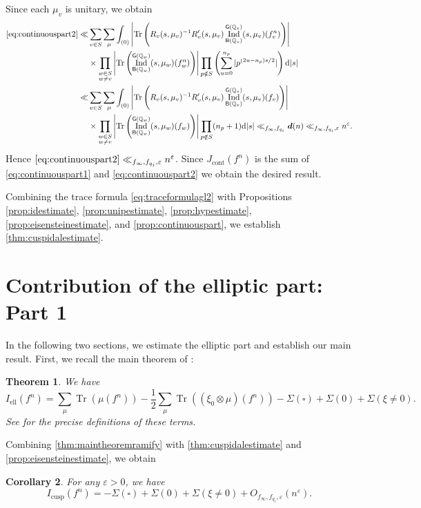\documentclass[10pt,oneside,reqno]{amsart}
\makeatletter
\newcommand\rmd{\mathrm{d}}
\newcommand\QQ{\mathbb{Q}}
\newcommand\B{\mathsf{B}}
\newcommand\G{\mathsf{G}}
\DeclareMathOperator\Tr{Tr}
\DeclareMathOperator\Ind{Ind}
\newcommand\el{\mathrm{ell}}
\theoremstyle{THEOREM}
\newtheorem{theorem}{Theorem}[section]
\newtheorem{corollary}[theorem]{Corollary}
\theoremstyle{DEFINITION}
\theoremstyle{EXERCISE}
\numberwithin{equation}{section}
\renewenvironment{proof}[1][\proofname]{\par
  \vspace{-6pt}
  \pushQED{\qed}
  \normalfont \topsep6\p@\@plus6\p@\relax
  \trivlist
  \item[\hskip\labelsep\rmfamily\bfseries
    #1\@addpunct{:}]\ignorespaces
}{
  \popQED\endtrivlist\@endpefalse
  \vspace{-6pt}
}
\makeatother
\begin{document}
\begin{proof}[Proof of \autoref{prop:continuouspart}]
Since each $\mu_v$ is unitary, we obtain
\begin{align*}
   \eqref{eq:continuouspart2}\ll & \sum_{v\in S}\sum_{\mu}\int_{(0)}\left|\Tr \left(R_v(s,\mu_v)^{-1}R_v'(s,\mu_v)\Ind_{\B(\QQ_v)}^{\G(\QQ_v)}(s,\mu_v)(f^n_v)\right)\right| \\
     &\times \prod_{\substack{w\in S\\w\neq v}}\left|\Tr\left(\Ind_{\B(\QQ_w)}^{\G(\QQ_w)}(s,\mu_w)(f^n_w)\right)\right|\prod_{p\notin S}\left(\sum_{u=0}^{n_p}|p^{(2u-n_p)s/2}|\right)\rmd |s|\\
   \ll &\sum_{v\in S}\sum_{\mu}\int_{(0)}\left|\Tr \left(R_v(s,\mu_v)^{-1}R_v'(s,\mu_v)\Ind_{\B(\QQ_v)}^{\G(\QQ_v)}(s,\mu_v)(f_v)\right)\right| \\
    &\times\prod_{\substack{w\in S\\w\neq v}}\left|\Tr\left(\Ind_{\B(\QQ_w)}^{\G(\QQ_w)}(s,\mu_w)(f_w)\right)\right|\prod_{p\notin S}(n_p+1)\rmd |s|\ll_{f_\infty, f_{q_i}} \bm{d}(n)\ll_{f_\infty, f_{q_i},\varepsilon} n^\varepsilon.
\end{align*} 
Hence $\eqref{eq:continuouspart2}\ll_{f_\infty, f_{q_i},\varepsilon} n^\varepsilon$. Since $J_{\mathrm{cont}}(f^n)$ is the sum of \eqref{eq:continuouspart1} and \eqref{eq:continuouspart2} we obtain the desired result.
\end{proof}
Combining the trace formula \eqref{eq:traceformulagl2} with Propositions \ref{prop:idestimate}, \ref{prop:unipestimate}, \ref{prop:hypestimate}, \ref{prop:eisensteinestimate}, and \ref{prop:continuouspart}, we establish \autoref{thm:cuspidalestimate}.

\section{Contribution of the elliptic part: Part 1}\label{sec:elliptic}
In the following two sections, we estimate the elliptic part and establish our main result. First, we recall the main theorem of \cite{cheng2025}:
\begin{theorem}\label{thm:maintheoremramify}
We have
\[
I_{\el}(f^n)=\sum_{\mu}\Tr(\mu(f^n))-\frac{1}{2}\sum_{\mu}\Tr((\xi_0\otimes\mu)(f^n))-\Sigma(\square)+\Sigma(0)+\Sigma(\xi\neq 0).
\]
See \cite[Theorem 8.10]{cheng2025} for the precise definitions of these terms.
\end{theorem}

Combining \autoref{thm:maintheoremramify} with \autoref{thm:cuspidalestimate} and \autoref{prop:eisensteinestimate}, we obtain
\begin{corollary}\label{cor:estimateellipticremain}
For any $\varepsilon>0$, we have
\[
I_{\mathrm{cusp}}(f^n)=-\Sigma(\square)+\Sigma(0)+\Sigma(\xi\neq 0)+O_{f_\infty,f_{q_i},\varepsilon}(n^\varepsilon).
\]
\end{corollary}
\end{document}
